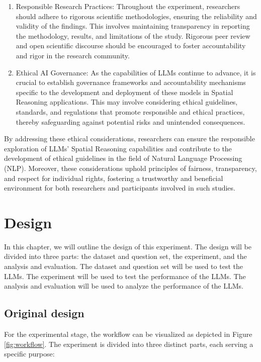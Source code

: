 \documentclass[twocolumn,11pt]{report}
\begin{document}
\begin{enumerate}
    \item Responsible Research Practices: Throughout the experiment, researchers should adhere to rigorous scientific methodologies, ensuring the reliability and validity of the findings. This involves maintaining transparency in reporting the methodology, results, and limitations of the study. Rigorous peer review and open scientific discourse should be encouraged to foster accountability and rigor in the research community.
    \item Ethical AI Governance: As the capabilities of LLMs continue to advance, it is crucial to establish governance frameworks and accountability mechanisms specific to the development and deployment of these models in Spatial Reasoning applications. This may involve considering ethical guidelines, standards, and regulations that promote responsible and ethical practices, thereby safeguarding against potential risks and unintended consequences.
\end{enumerate}
By addressing these ethical considerations, researchers can ensure the responsible exploration of LLMs' Spatial Reasoning capabilities and contribute to the development of ethical guidelines in the field of Natural Language Processing (NLP). Moreover, these considerations uphold principles of fairness, transparency, and respect for individual rights, fostering a trustworthy and beneficial environment for both researchers and participants involved in such studies.


\chapter{Design}\label{chap:design}

In this chapter, we will outline the design of this experiment. The design will be divided into three parts: the dataset and question set, the experiment, and the analysis and evaluation. The dataset and question set will be used to test the LLMs. The experiment will be used to test the performance of the LLMs. The analysis and evaluation will be used to analyze the performance of the LLMs.

\section{Original design}\label{chap:first_design}
For the experimental stage, the workflow can be visualized as depicted in Figure \ref{fig:workflow}. The experiment is divided into three distinct parts, each serving a specific purpose:
\end{document}
